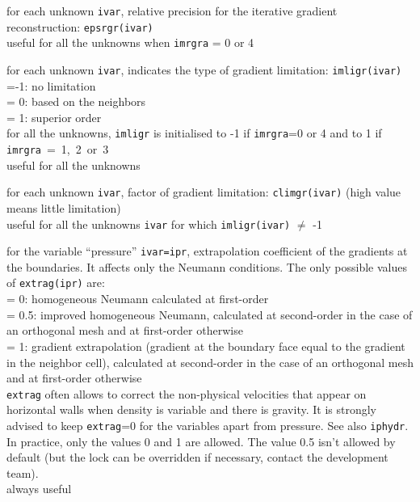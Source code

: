 {for each unknown {\tt ivar}, relative precision for the iterative gradient
reconstruction: {\tt epsrgr(ivar)}\\
useful for all the unknowns when {\tt imrgra} = 0 or 4}

{for each unknown {\tt ivar}, indicates the type of gradient limitation:
{\tt imligr(ivar)}\\
\hspace*{1.3cm}=-1: no limitation\\
\hspace*{1.3cm}= 0: based on the neighbors\\
\hspace*{1.3cm}= 1: superior order\\
for all the unknowns, {\tt imligr} is initialised to -1 if {\tt imrgra}=0 or 4
 and to 1 if \mbox{{\tt imrgra} = 1, 2 or 3}\\
useful for all the unknowns}

{for each unknown {\tt ivar}, factor of gradient limitation: {\tt climgr(ivar)}
(high value means little limitation)\\
useful for all the unknowns {\tt ivar} for which {\tt imligr(ivar)} $\ne$ -1}

{for the variable ``pressure'' {\tt ivar=ipr}, extrapolation coefficient
of the gradients at the boundaries. It affects only the Neumann conditions.
The only possible values of {\tt extrag(ipr)} are:\\
\hspace*{1.3cm}= 0: homogeneous Neumann calculated at first-order\\
\hspace*{1.3cm}= 0.5: improved homogeneous Neumann, calculated at
second-order in the case of an orthogonal mesh and at first-order otherwise\\
\hspace*{1.3cm}= 1: gradient extrapolation (gradient at the boundary face
equal to the gradient in the neighbor cell), calculated at
second-order in the case of an orthogonal mesh and at first-order otherwise\\
{\tt extrag} often allows to correct the non-physical velocities that
appear on horizontal walls when density is variable and there is gravity.
It is strongly advised to keep {\tt extrag}=0 for the variables apart from
pressure. See also {\tt iphydr}.\\
In practice, only the values 0 and 1 are allowed. The
value 0.5 isn't allowed by default (but the lock can be overridden if
necessary, contact the development team).\\
always useful}

